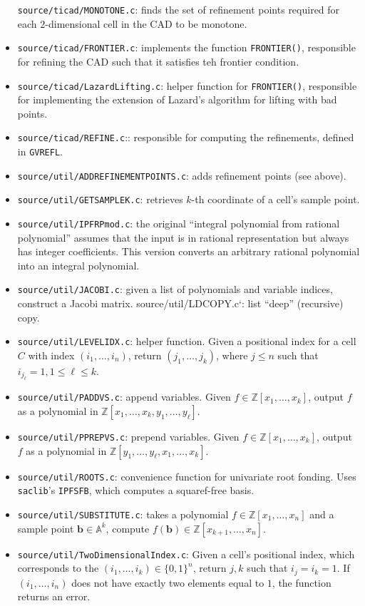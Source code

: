 \documentclass[
]{book}
\theoremstyle{definition}
\theoremstyle{definition}
\theoremstyle{definition}
\theoremstyle{definition}
\theoremstyle{remark}
\begin{document}
\begin{itemize}
  \texttt{source/ticad/MONOTONE.c}: finds the set of refinement points required for each \(2\)-dimensional cell in the CAD to be monotone.
\item
  \texttt{source/ticad/FRONTIER.c}: implements the function \texttt{FRONTIER()}, responsible for refining the CAD such that it satisfies teh frontier condition.
\item
  \texttt{source/ticad/LazardLifting.c}: helper function for \texttt{FRONTIER()}, responsible for implementing the extension of Lazard's algorithm for lifting with bad points.
\item
  \texttt{source/ticad/REFINE.c}:: responsible for computing the refinements, defined in \texttt{GVREFL}.
\item
  \texttt{source/util/ADDREFINEMENTPOINTS.c}: adds refinement points (see above).
\item
  \texttt{source/util/GETSAMPLEK.c}: retrieves \(k\)-th coordinate of a cell's sample point.
\item
  \texttt{source/util/IPFRPmod.c}: the original ``integral polynomial from rational polynomial'' assumes that the input is in rational representation but always has integer coefficients. This version converts an arbitrary rational polynomial into an integral polynomial.
\item
  \texttt{source/util/JACOBI.c}: given a list of polynomials and variable indices, construct a Jacobi matrix.
  \texttt{}source/util/LDCOPY.c`: list ``deep'' (recursive) copy.
\item
  \texttt{source/util/LEVELIDX.c}: helper function. Given a positional index for a cell \(C\) with index \((i_1,\ldots,i_n)\), return \((j_1,\ldots,j_k)\), where \(j\le n\) such that \(i_{j_\ell} = 1, 1 \le \ell \le k\).
\item
  \texttt{source/util/PADDVS.c}: append variables. Given \(f \in \mathbb{Z}[x_1,\ldots,x_k]\), output \(f\) as a polynomial in \(\mathbb{Z}[x_1,\ldots,x_k,y_1,\ldots,y_\ell]\).
\item
  \texttt{source/util/PPREPVS.c}: prepend variables. Given \(f \in \mathbb{Z}[x_1,\ldots,x_k]\), output \(f\) as a polynomial in \(\mathbb{Z}[y_1,\ldots,y_\ell,x_1,\ldots,x_k]\).
\item
  \texttt{source/util/ROOTS.c}: convenience function for univariate root fonding. Uses \texttt{saclib}'s \texttt{IPFSFB}, which computes a squaref-free basis.
\item
  \texttt{source/util/SUBSTITUTE.c}: takes a polynomial \(f \in \mathbb{Z}[x_1,\ldots,x_n]\) and a sample point \(\mathbf{b} \in \mathbb{A}^k\), compute \(f(\mathbf{b}) \in \mathbb{Z}[x_{k+1},\ldots,x_n]\).
\item
  \texttt{source/util/TwoDimensionalIndex.c}: Given a cell's positional index, which corresponds to the \((i_1,\ldots,i_k) \in \{0,1\}^n\), return \(j,k\) such that \(i_j = i_k = 1\). If \((i_1,\ldots,i_n)\) does not have exactly two elements equal to \(1\), the function returns an error.
\end{itemize}
\end{document}
